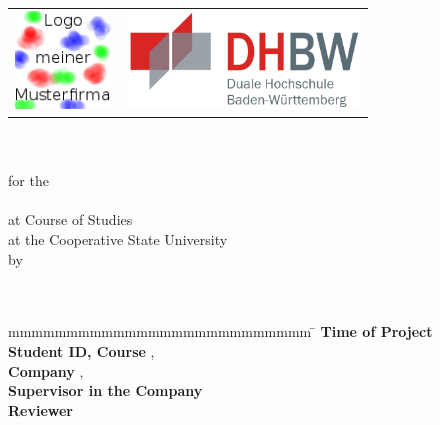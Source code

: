 \begin{titlepage}
	\begin{longtable}{p{} p{}}
	  {\includegraphics[height=2.6cm]{images/logo.png}} & 
	  {\includegraphics[height=2.6cm]{images/dhbw.png}}
	\end{longtable}
	\enlargethispage{20mm}
	\begin{center}
	  \vspace*{12mm}	{\LARGE\bf \titel }\\
	  \vspace*{12mm}	{\large\bf \arbeit}\\
	  \vspace*{12mm}	for the\\
	  \vspace*{3mm} 	{\bf \abschluss}\\
	  \vspace*{12mm}	at Course of Studies \studiengang\\
	  \vspace*{3mm} 	at the Cooperative State University \dhbw\\
	  \vspace*{12mm}	by\\
	  \vspace*{3mm} 	{\large\bf \autor}\\
	  \vspace*{12mm}	\datumAbgabe\\
	\end{center}
	\vfill
	\begin{spacing}{1.2}
	\begin{tabbing}
		mmmmmmmmmmmmmmmmmmmmmmmmmm     \= \kill
		\textbf{Time of Project}  \>  \zeitraum\\
		\textbf{Student ID, Course}  \>  \matrikelnr, \kurs\\
		\textbf{Company}      \>  \firma, \firmenort\\
		\textbf{Supervisor in the Company}              \>  \betreuer\\
		\textbf{Reviewer}             \>  \gutachter
	\end{tabbing}
	\end{spacing}
\end{titlepage}
